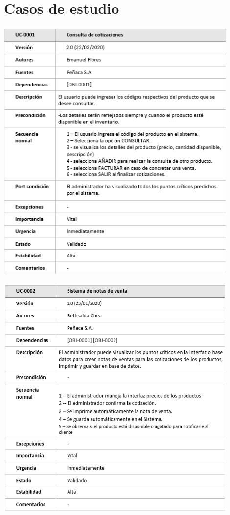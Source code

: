 \documentclass[12pt,a4paper]{article}
\begin{document}
\section{Casos de estudio}\textbf{}
\begin{center}
\includegraphics[width=0.9\textwidth]{casodeusouno.png}   
\end{center}
\begin{center}
\includegraphics[width=0.9\textwidth]{casodeusodos.png}   
\end{center}
\end{document}
